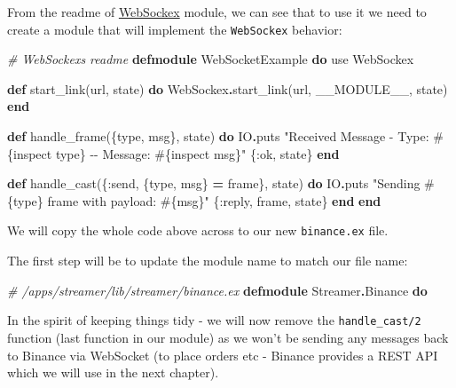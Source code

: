 \documentclass[
]{book}
\newenvironment{Shaded}{\begin{snugshade}}{\end{snugshade}}
\newcommand{\CommentTok}[1]{\textcolor[rgb]{0.56,0.35,0.01}{\textit{#1}}}
\newcommand{\ConstantTok}[1]{\textcolor[rgb]{0.00,0.00,0.00}{#1}}
\newcommand{\ImportTok}[1]{#1}
\newcommand{\KeywordTok}[1]{\textcolor[rgb]{0.13,0.29,0.53}{\textbf{#1}}}
\newcommand{\NormalTok}[1]{#1}
\newcommand{\OperatorTok}[1]{\textcolor[rgb]{0.81,0.36,0.00}{\textbf{#1}}}
\newcommand{\OtherTok}[1]{\textcolor[rgb]{0.56,0.35,0.01}{#1}}
\newcommand{\StringTok}[1]{\textcolor[rgb]{0.31,0.60,0.02}{#1}}
\newcommand{\VariableTok}[1]{\textcolor[rgb]{0.00,0.00,0.00}{#1}}
\begin{document}
From the readme of \href{https://github.com/Azolo/websockex}{WebSockex} module, we can see that to use it we need to create a module that will implement the \texttt{WebSockex} behavior:

\begin{Shaded}
\begin{Highlighting}[]
\CommentTok{\# WebSockex\textquotesingle{}s readme}
\KeywordTok{defmodule} \ConstantTok{WebSocketExample} \KeywordTok{do}
  \ImportTok{use} \ConstantTok{WebSockex}

  \KeywordTok{def}\NormalTok{ start\_link(url, state) }\KeywordTok{do}
    \ConstantTok{WebSockex}\OperatorTok{.}\NormalTok{start\_link(url, }\ConstantTok{\_\_MODULE\_\_}\NormalTok{, state)}
  \KeywordTok{end}

  \KeywordTok{def}\NormalTok{ handle\_frame(\{type, msg\}, state) }\KeywordTok{do}
    \ConstantTok{IO}\OperatorTok{.}\NormalTok{puts }\StringTok{"Received Message {-} Type: }\OtherTok{\#\{}\NormalTok{inspect type}\OtherTok{\}}\StringTok{ {-}{-} Message: }\OtherTok{\#\{}\NormalTok{inspect msg}\OtherTok{\}}\StringTok{"}
\NormalTok{    \{}\VariableTok{:ok}\NormalTok{, state\}}
  \KeywordTok{end}

  \KeywordTok{def}\NormalTok{ handle\_cast(\{}\VariableTok{:send}\NormalTok{, \{type, msg\} }\OperatorTok{=}\NormalTok{ frame\}, state) }\KeywordTok{do}
    \ConstantTok{IO}\OperatorTok{.}\NormalTok{puts }\StringTok{"Sending }\OtherTok{\#\{}\NormalTok{type}\OtherTok{\}}\StringTok{ frame with payload: }\OtherTok{\#\{}\NormalTok{msg}\OtherTok{\}}\StringTok{"}
\NormalTok{    \{}\VariableTok{:reply}\NormalTok{, frame, state\}}
  \KeywordTok{end}
\KeywordTok{end}
\end{Highlighting}
\end{Shaded}

We will copy the whole code above across to our new \texttt{binance.ex} file.

The first step will be to update the module name to match our file name:

\begin{Shaded}
\begin{Highlighting}[]
\CommentTok{\# /apps/streamer/lib/streamer/binance.ex}
\KeywordTok{defmodule} \ConstantTok{Streamer}\OperatorTok{.}\ConstantTok{Binance} \KeywordTok{do}
\end{Highlighting}
\end{Shaded}

In the spirit of keeping things tidy - we will now remove the \texttt{handle\_cast/2} function (last function in our module) as we won't be sending any messages back to Binance via WebSocket (to place orders etc - Binance provides a REST API which we will use in the next chapter).
\end{document}
